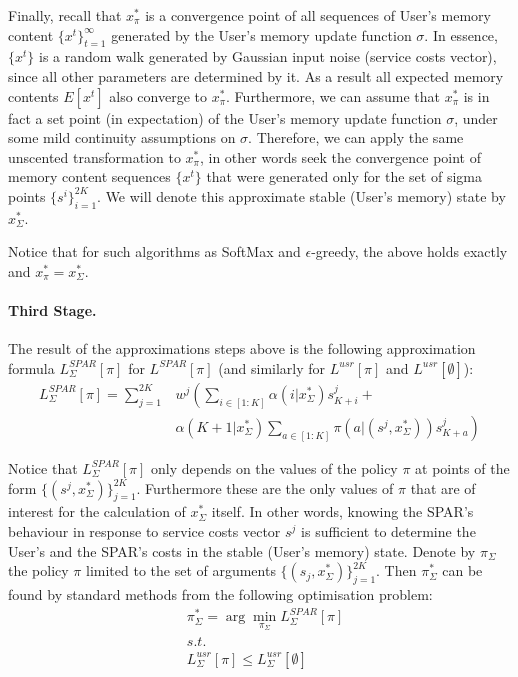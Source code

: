 \documentclass{msdm2012}
\begin{document}
Finally, recall that $x^*_\pi$ is a convergence point of all sequences of
User's memory content $\{x^t\}_{t=1}^\infty$ generated by the User's
memory update function $\sigma$. In essence, $\{x^t\}$ is a random
walk generated by Gaussian input noise (service costs vector), since
all other parameters are determined by it. As a result all expected
memory contents $E[x^t]$ also converge to $x^*_\pi$. Furthermore, we can
assume that $x^*_\pi$ is in fact a set point (in expectation) of the
User's memory update function $\sigma$, under some mild continuity
assumptions on $\sigma$. Therefore, we can apply the same unscented
transformation to $x^*_\pi$, in other words seek the convergence point of
memory content sequences $\{x^t\}$ that were generated only for the
set of sigma points $\{s^i\}_{i=1}^{2K}$. We will denote this
approximate stable (User's memory) state by $x^*_\Sigma$.

Notice that for such algorithms as SoftMax and $\epsilon$-greedy, the
above holds exactly and $x^*_\pi=x^*_\Sigma$.

\paragraph{Third Stage.} 
The result of the approximations steps above is the following approximation formula $L^{SPAR}_\Sigma[\pi]$ for $L^{SPAR}[\pi]$ (and
similarly for $L^{usr}[\pi]$ and $L^{usr}[\emptyset]$):
\begin{equation*}
\begin{split}
L^{SPAR}_\Sigma[\pi]=\sum\limits_{j=1}^{2K}&w^j\left(
\sum\limits_{i\in[1:K]}\alpha(i|x^*_\Sigma)s^j_{K+i}+\right.\\
&\left.\alpha(K+1|x^*_\Sigma)\sum\limits_{a\in[1:K]}\pi(a|(s^j,x^*_\Sigma))s^j_{K+a}
\right)
\end{split}
\end{equation*}

Notice that $L^{SPAR}_\Sigma[\pi]$ only depends on the values of the
policy $\pi$ at points of the form $\{(s^j,x^*_\Sigma)\}_{j=1}^{2K}$.
Furthermore these are the only values of $\pi$ that are of interest for the
calculation of $x^*_\Sigma$ itself. In other words, knowing the SPAR's
behaviour in response to service costs vector $s^j$ is sufficient to
determine the User's and the SPAR's costs in the stable (User's
memory) state.  Denote by $\pi_\Sigma$ the policy $\pi$ limited to the
set of arguments $\{(s_j,x^*_\Sigma)\}_{j=1}^{2K}$. Then
$\pi^*_\Sigma$ can be found by standard methods from the following
optimisation problem:
\begin{eqnarray*}
&\pi^*_\Sigma=\arg\min\limits_{\pi_\Sigma}L^{SPAR}_\Sigma[\pi]\\
&\displaystyle{s.t.}\\
&L^{usr}_\Sigma[\pi]\leq L^{usr}_\Sigma[\emptyset]
\end{eqnarray*}
\end{document}
